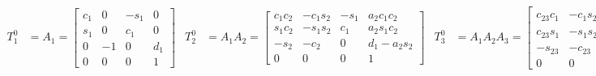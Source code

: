 \begin{subequations}
    \begin{align}
        T_1^0 &= A_1 =
        \begin{bmatrix}\label{eq:T1}
            c_1 & 0 & -s_1 & 0\\
            s_1 & 0 & c_1 & 0\\
            0 & -1 & 0 & d_1\\
            0 & 0 & 0 & 1
        \end{bmatrix}
    \end{align}
    \begin{align}
        T_2^0 &= A_1A_2 =
        \begin{bmatrix}\label{eq:T2}
            c_1c_2 & -c_1s_2 & -s_1 & a_2c_1c_2\\
            s_1c_2 & -s_1s_2 & c_1 & a_2s_1c_2\\
            -s_2 & -c_2 & 0 & d_1 - a_2s_2\\
            0 & 0 & 0 & 1
        \end{bmatrix}
        \end{align}
        \begin{align}
        T_3^0 &= A_1A_2A_3=
        \begin{bmatrix}\label{eq:T3}
            c_{23}c_1 & -c_1s_{23} & -s_1 & c_1(a_3c_{23} + a_2c_2)\\
            c_{23}s_1 & -s_1s_{23} & c_1 & s_1(a_3c_{23} + a_2c_2)\\
            -s_{23} & -c_{23} & 0 & d_1 - a_3s_{23}-a_2s_2\\
            0 & 0 & 0 & 1
        \end{bmatrix}
        \end{align}
        \begin{align}        
        T_4^0 &= A_1A_2A_3A_4=
        \begin{bmatrix}\label{eq:T4}
            c_1c_{234} & -s_1 & c_1s_{234} & c_1(a_3c_{23} + a_2c_2)\\
            s_1c_{234} & c_1 & s_1s_{234} & s_1(a_3c_{23} + a_2c_2)\\
            -s_{234} & 0 & c_{234} & d_1 - a_3s_{23} - a_2s_2\\
            0 & 0 & 0 & 1
        \end{bmatrix}
        \end{align}
        \begin{align}        
        \begin{split}
            T_5^0 &= A_1A_2A_3A_4A_5\\ &=

\end{split}
\end{align}
\end{subequations}
